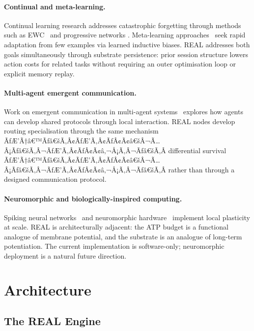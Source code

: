 \documentclass[10pt,twocolumn]{article}
\begin{document}
\paragraph{Continual and meta-learning.}
Continual learning research addresses catastrophic forgetting through methods
such as EWC~\citep{kirkpatrick2017overcoming} and progressive networks
\citep{rusu2016progressive}.
Meta-learning approaches~\citep{finn2017model} seek rapid adaptation from few
examples via learned inductive biases.
REAL addresses both goals simultaneously through substrate persistence: prior
session structure lowers action costs for related tasks without requiring an
outer optimisation loop or explicit memory replay.

\paragraph{Multi-agent emergent communication.}
Work on emergent communication in multi-agent systems~\citep{lazaridou2020emergent}
explores how agents can develop shared protocols through local interaction.
REAL nodes develop routing specialisation through the same mechanism ÃƒÆ’Ã†â€™Ãƒâ€šÃ‚Â¢ÃƒÆ’Ã‚Â¢ÃƒÂ¢Ã¢â€šÂ¬Ã…Â¡Ãƒâ€šÃ‚Â¬ÃƒÆ’Ã‚Â¢ÃƒÂ¢Ã¢â‚¬Å¡Ã‚Â¬Ãƒâ€šÃ‚Â
differential survival ÃƒÆ’Ã†â€™Ãƒâ€šÃ‚Â¢ÃƒÆ’Ã‚Â¢ÃƒÂ¢Ã¢â€šÂ¬Ã…Â¡Ãƒâ€šÃ‚Â¬ÃƒÆ’Ã‚Â¢ÃƒÂ¢Ã¢â‚¬Å¡Ã‚Â¬Ãƒâ€šÃ‚Â rather than through a designed communication protocol.

\paragraph{Neuromorphic and biologically-inspired computing.}
Spiking neural networks~\citep{maass1997networks} and neuromorphic
hardware~\citep{davies2018loihi} implement local plasticity at scale.
REAL is architecturally adjacent: the ATP budget is a functional analogue of
membrane potential, and the substrate is an analogue of long-term potentiation.
The current implementation is software-only; neuromorphic deployment is a
natural future direction.

\section{Architecture}
\label{sec:architecture}

\subsection{The REAL Engine}
\end{document}
